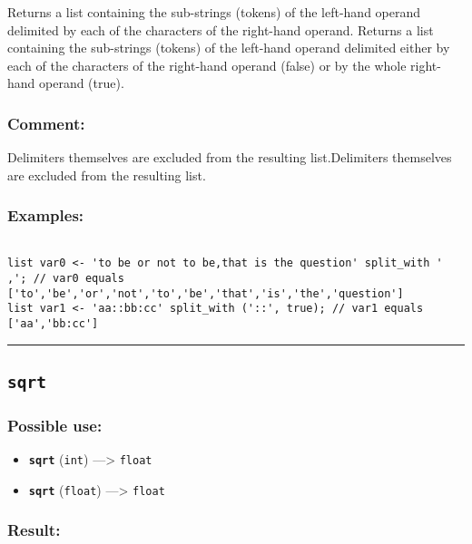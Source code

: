 \documentclass[]{book}
\providecommand{\tightlist}{%
  \setlength{\itemsep}{0pt}\setlength{\parskip}{0pt}}
\theoremstyle{definition}
\theoremstyle{definition}
\theoremstyle{definition}
\theoremstyle{remark}
\begin{document}
Returns a list containing the sub-strings (tokens) of the left-hand
operand delimited by each of the characters of the right-hand operand.
Returns a list containing the sub-strings (tokens) of the left-hand
operand delimited either by each of the characters of the right-hand
operand (false) or by the whole right-hand operand (true).

\subsubsection{Comment:}\label{comment-91}

Delimiters themselves are excluded from the resulting list.Delimiters
themselves are excluded from the resulting list.

\subsubsection{Examples:}\label{examples-346}

\begin{verbatim}
 
list var0 <- 'to be or not to be,that is the question' split_with ' ,'; // var0 equals ['to','be','or','not','to','be','that','is','the','question'] 
list var1 <- 'aa::bb:cc' split_with ('::', true); // var1 equals ['aa','bb:cc']
\end{verbatim}

\begin{center}\rule{0.5\linewidth}{\linethickness}\end{center}

\subsection{\texorpdfstring{\texttt{sqrt}}{sqrt}}\label{sqrt}

\subsubsection{Possible use:}\label{possible-use-498}

\begin{itemize}
\tightlist
\item
  \textbf{\texttt{sqrt}} (\texttt{int}) ---\textgreater{} \texttt{float}
\item
  \textbf{\texttt{sqrt}} (\texttt{float}) ---\textgreater{}
  \texttt{float}
\end{itemize}

\subsubsection{Result:}\label{result-482}
\end{document}
